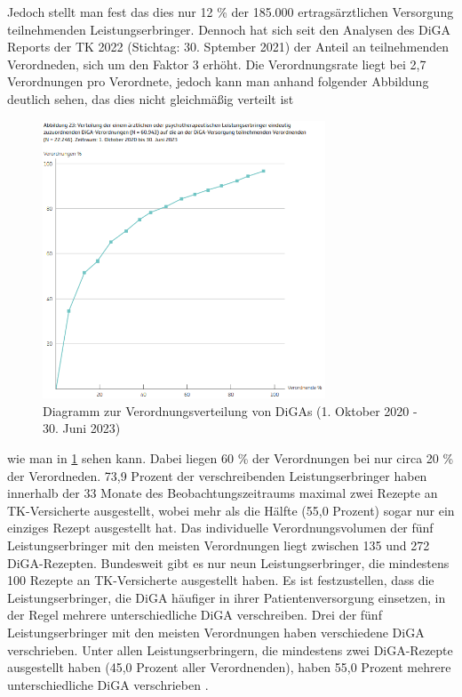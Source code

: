 \documentclass{article}
\begin{document}
			Jedoch stellt man fest das dies nur 12 \% der 185.000 ertragsärztlichen Versorgung teilnehmenden Leistungserbringer. Dennoch hat sich seit den Analysen des DiGA Reports der TK 2022 (Stichtag: 30. Sptember 2021) der Anteil an teilnehmenden Verordneden, sich um den Faktor 3 erhöht. Die Verordnungsrate liegt bei 2,7 Verordnungen pro Verordnete, jedoch kann man anhand folgender Abbildung deutlich sehen, das dies nicht gleichmäßig verteilt ist
			\begin{figure}[hbtp]
				\centering
				\includegraphics[width=0.75\textwidth]{./grafiken/abbildung_verordnungen_pro_verordneten_diga}
				\caption[Verordnungsverteilung (1. Oktober 2020 - 30. Juni 2023)]{Diagramm zur Verordnungsverteilung von DiGAs (1. Oktober 2020 - 30. Juni 2023)}
				\label{Abb-verordnungen-diga}
			\end{figure}
			wie man in \ref{Abb-verordnungen-diga} sehen kann. Dabei liegen 60 \% der Verordnungen bei nur circa 20 \% der Verordneden. 73,9 Prozent der verschreibenden Leistungserbringer haben innerhalb der 33 Monate des Beobachtungszeitraums maximal zwei Rezepte an TK-Versicherte ausgestellt, wobei mehr als die Hälfte (55,0 Prozent) sogar nur ein einziges Rezept ausgestellt hat. Das individuelle Verordnungsvolumen der fünf Leistungserbringer mit den meisten Verordnungen liegt zwischen 135 und 272 DiGA-Rezepten. Bundesweit gibt es nur neun Leistungserbringer, die mindestens 100 Rezepte an TK-Versicherte ausgestellt haben. Es ist festzustellen, dass die Leistungserbringer, die DiGA häufiger in ihrer Patientenversorgung einsetzen, in der Regel mehrere unterschiedliche DiGA verschreiben. Drei der fünf Leistungserbringer mit den meisten Verordnungen haben verschiedene DiGA verschrieben. Unter allen Leistungserbringern, die mindestens zwei DiGA-Rezepte ausgestellt haben (45,0 Prozent aller Verordnenden), haben 55,0 Prozent mehrere unterschiedliche DiGA verschrieben \cite[vgl. S. 28]{TK-Report-2}.
			
\end{document}
